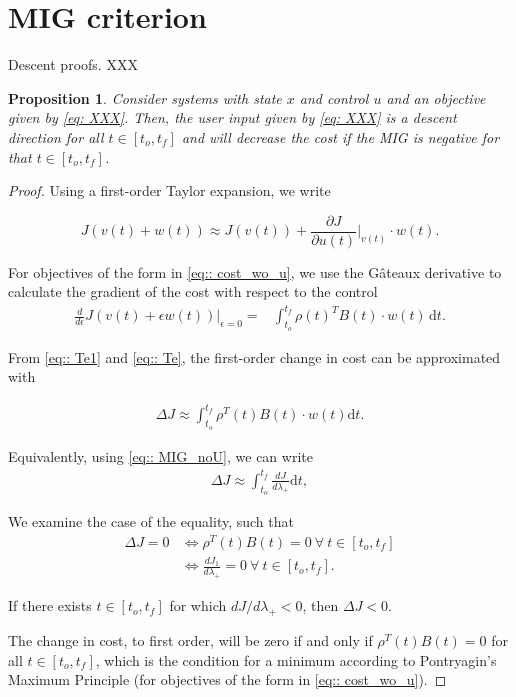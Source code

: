 \documentclass[12pt]{article}
\newtheorem{prop}{Proposition}
\begin{document}
\section{MIG criterion}

Descent proofs. XXX

\begin{prop}
\label{prop:: descent}
	Consider systems with state $x$ and control $u$ and an objective given by \eqref{eq: XXX}. Then, the user input given by \eqref{eq: XXX} is a descent direction for all $t\in[t_o, t_f]$ and will decrease the cost if the MIG is negative for that $t\in[t_o, t_f]$. 
\end{prop}
	
\begin{proof}
Using a first-order Taylor expansion, we write

\begin{equation}\label{eq:: Te1}
J(v(t) + w(t)) \approx J(v(t)) + \frac{\partial J}{\partial u(t)}\Big\rvert_{v(t)}\cdot w(t). 
\end{equation}

For objectives of the form in \eqref{eq:: cost_wo_u}, we use the G\^ateaux derivative to calculate the gradient of the cost with respect to the control 
\begin{align}
\label{eq:: Te}
\frac{d}{d\epsilon}J(v(t) + \epsilon w(t))\Big\rvert_{\epsilon=0} =& \int_{t_o}^{t_f} \rho(t)^TB(t)\cdot w(t)\,\mathrm{d}t.
\end{align}

From \eqref{eq:: Te1} and \eqref{eq:: Te}, the first-order change in cost can be approximated with 

\begin{align*}
\Delta J \approx \int_{t_o}^{t_f} \rho^T(t) B(t) \cdot w(t) \mathrm{d}t.
\end{align*}

Equivalently, using \eqref{eq:: MIG_noU}, we can write
\begin{align*}
\Delta J \approx \int_{t_o}^{t_f} \frac{dJ}{d\lambda_+} \mathrm{d}t, 
\end{align*}


We examine the case of the equality, such that 
\begin{align*}
\Delta J = 0 &\Leftrightarrow \rho^T(t) B(t) = 0~\forall~t\in[t_o, t_f]\\
&\Leftrightarrow \frac{dJ_1}{d\lambda_+} = 0~\forall~t\in[t_o, t_f].
\end{align*}

If there exists $t\in[t_o,t_f]$ for which $dJ/d\lambda_+ < 0$, then $\Delta J <0$. 

The change in cost, to first order, will be zero if and only if $\rho^T(t) B(t) = 0$ for all $t \in [t_o, t_f]$, which is the condition for a minimum according to Pontryagin's Maximum Principle (for objectives of the form in \eqref{eq:: cost_wo_u}).

\end{proof}

   
\end{document}
